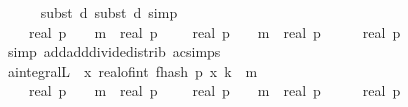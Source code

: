 \begin{isabellebody}
\ \ \ \ \isamarkupfalse%
\ {\isacharparenleft}{\kern0pt}subst\ d{\isacharunderscore}{\kern0pt}{}{\isacharcomma}{\kern0pt}\ subst\ d{\isacharunderscore}{\kern0pt}{}{\isacharcomma}{\kern0pt}\ simp{\isacharparenright}{\kern0pt}\isanewline
\ \ \isamarkupfalse%
\ \isamarkupfalse%
\ {\isachardoublequoteopen}{\isachardot}{\kern0pt}{\isachardot}{\kern0pt}{\isachardot}{\kern0pt}\ {\isacharequal}{\kern0pt}\ \ \isanewline
\ \ \ \ {\isacharparenleft}{\kern0pt}{\isacharparenleft}{\kern0pt}real\ p\ {\isacharminus}{\kern0pt}\ {}{\isacharparenright}{\kern0pt}\ {\isacharcircum}{\kern0pt}\ m\ {\isacharasterisk}{\kern0pt}\ {\isacharparenleft}{\kern0pt}real\ p\ {\isacharplus}{\kern0pt}\ {}{\isacharparenright}{\kern0pt}\ {\isacharplus}{\kern0pt}\ {\isacharparenleft}{\kern0pt}{\isacharminus}{\kern0pt}\ real\ p\ {\isacharminus}{\kern0pt}\ {}{\isacharparenright}{\kern0pt}\ {\isacharcircum}{\kern0pt}\ m\ {\isacharasterisk}{\kern0pt}\ {\isacharparenleft}{\kern0pt}real\ p\ {\isacharminus}{\kern0pt}\ {}{\isacharparenright}{\kern0pt}{\isacharparenright}{\kern0pt}\ {\isacharslash}{\kern0pt}\ {\isacharparenleft}{\kern0pt}{}\ {\isacharasterisk}{\kern0pt}\ real\ p{\isacharparenright}{\kern0pt}{\isachardoublequoteclose}\isanewline
\ \ \ \ \isamarkupfalse%
\ {\isacharparenleft}{\kern0pt}simp\ add{\isacharcolon}{\kern0pt}add{\isacharunderscore}{\kern0pt}divide{\isacharunderscore}{\kern0pt}distrib\ ac{\isacharunderscore}{\kern0pt}simps{\isacharparenright}{\kern0pt}\isanewline
\ \ \isamarkupfalse%
\ \isamarkupfalse%
\ a{\isacharcolon}{\kern0pt}{\isachardoublequoteopen}integral\isactrlsup L\ {\isasymOmega}\ {\isacharparenleft}{\kern0pt}{\isasymlambda}x{\isachardot}{\kern0pt}\ real{\isacharunderscore}{\kern0pt}of{\isacharunderscore}{\kern0pt}int\ {\isacharparenleft}{\kern0pt}f{}{\isacharunderscore}{\kern0pt}hash\ p\ x\ k{\isacharparenright}{\kern0pt}\ {\isacharcircum}{\kern0pt}\ m{\isacharparenright}{\kern0pt}\ {\isacharequal}{\kern0pt}\ \isanewline
\ \ \ \ {\isacharparenleft}{\kern0pt}{\isacharparenleft}{\kern0pt}real\ p\ {\isacharminus}{\kern0pt}\ {}{\isacharparenright}{\kern0pt}\ {\isacharcircum}{\kern0pt}\ m\ {\isacharasterisk}{\kern0pt}\ {\isacharparenleft}{\kern0pt}real\ p\ {\isacharplus}{\kern0pt}\ {}{\isacharparenright}{\kern0pt}\ {\isacharplus}{\kern0pt}\ {\isacharparenleft}{\kern0pt}{\isacharminus}{\kern0pt}\ real\ p\ {\isacharminus}{\kern0pt}\ {}{\isacharparenright}{\kern0pt}\ {\isacharcircum}{\kern0pt}\ m\ {\isacharasterisk}{\kern0pt}\ {\isacharparenleft}{\kern0pt}real\ p\ {\isacharminus}{\kern0pt}\ {}{\isacharparenright}{\kern0pt}{\isacharparenright}{\kern0pt}\ {\isacharslash}{\kern0pt}\ {\isacharparenleft}{\kern0pt}{}\ {\isacharasterisk}{\kern0pt}\ real\ p{\isacharparenright}{\kern0pt}{\isachardoublequoteclose}\ \isamarkupfalse%

\end{isabellebody}
